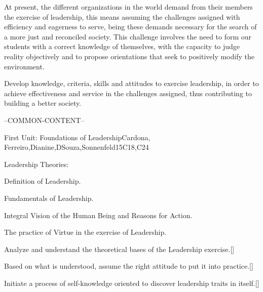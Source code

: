 \begin{syllabus}


\begin{justification}
	At present, the different organizations in the world demand from their members the exercise of leadership, this means assuming the challenges assigned with efficiency and eagerness to serve, being these demands necessary for the search of a more just and reconciled society. 
	This challenge involves the need to form our students with a correct knowledge of themselves, with the capacity to judge reality objectively and to propose orientations that seek to positively modify the environment.
\end{justification}

\begin{goals}
\item Develop knowledge, criteria, skills and attitudes to exercise leadership, in order to achieve effectiveness and service in the challenges assigned, thus contributing to building a better society.
\end{goals}

--COMMON-CONTENT--

\begin{unit}{}{First Unit: Foundations of Leadership}{Cardona, Ferreiro,Dianine,DSouza,Sonnenfeld}{15}{C18,C24}
\begin{topics}
	\item Leadership Theories: 
	\item Definition of Leadership.
	\item Fundamentals of Leadership.
	\item Integral Vision of the Human Being and Reasons for Action.
	\item The practice of Virtue in the exercise of Leadership.
\end{topics}
\begin{learningoutcomes}
	\item Analyze and understand the theoretical bases of the Leadership exercise.[\Familiarity]
	\item Based on what is understood, assume the right attitude to put it into practice.[\Familiarity]
	\item Initiate a process of self-knowledge oriented to discover leadership traits in itself.[\Familiarity]
\end{learningoutcomes}
\end{unit}


\end{syllabus}
